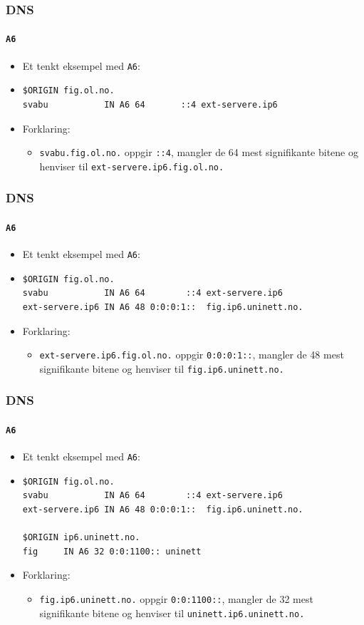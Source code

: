 \begin{frame}[fragile]%
  \frametitle{DNS}
  \framesubtitle{\texttt{A6}}
  \begin{itemize}%
  \item Et tenkt eksempel med \texttt{A6}:
  \item 
\begin{verbatim}
$ORIGIN fig.ol.no.
svabu           IN A6 64       ::4 ext-servere.ip6
\end{verbatim}
  \item Forklaring:
    \begin{itemize}%
    \item \texttt{svabu.fig.ol.no.} oppgir \texttt{::4}, mangler de 64
      mest signifikante bitene og henviser til
      \texttt{ext-servere.ip6.fig.ol.no.}
    \end{itemize}
  \end{itemize}
\end{frame}

\begin{frame}[fragile]%
  \frametitle{DNS}
  \framesubtitle{\texttt{A6}}
  \begin{itemize}%
  \item Et tenkt eksempel med \texttt{A6}:
  \item 
\begin{verbatim}
$ORIGIN fig.ol.no.
svabu           IN A6 64        ::4 ext-servere.ip6
ext-servere.ip6 IN A6 48 0:0:0:1::  fig.ip6.uninett.no.
\end{verbatim}
  \item Forklaring:
    \begin{itemize}%
    \item \texttt{ext-servere.ip6.fig.ol.no.} oppgir
      \texttt{0:0:0:1::}, mangler de 48 mest signifikante bitene og
      henviser til \texttt{fig.ip6.uninett.no.}
    \end{itemize}
  \end{itemize}
\end{frame}

\begin{frame}[fragile]%
  \frametitle{DNS}
  \framesubtitle{\texttt{A6}}
  \begin{itemize}%
  \item Et tenkt eksempel med \texttt{A6}:
  \item 
\begin{verbatim}
$ORIGIN fig.ol.no.
svabu           IN A6 64        ::4 ext-servere.ip6
ext-servere.ip6 IN A6 48 0:0:0:1::  fig.ip6.uninett.no.

$ORIGIN ip6.uninett.no.
fig     IN A6 32 0:0:1100:: uninett
\end{verbatim}
  \item Forklaring:
    \begin{itemize}%
    \item \texttt{fig.ip6.uninett.no.} oppgir \texttt{0:0:1100::},
      mangler de 32 mest signifikante bitene og henviser til
      \texttt{uninett.ip6.uninett.no.}
    \end{itemize}
  \end{itemize}
\end{frame}

